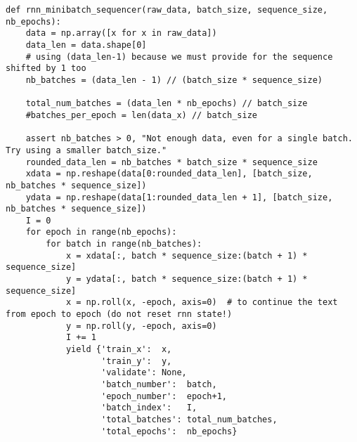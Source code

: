 \documentclass[10pt]{amsart}
\theoremstyle{definition}
\begin{document}
\begin{verbatim}
def rnn_minibatch_sequencer(raw_data, batch_size, sequence_size, nb_epochs):
    data = np.array([x for x in raw_data])
    data_len = data.shape[0]
    # using (data_len-1) because we must provide for the sequence shifted by 1 too
    nb_batches = (data_len - 1) // (batch_size * sequence_size)

    total_num_batches = (data_len * nb_epochs) // batch_size
    #batches_per_epoch = len(data_x) // batch_size

    assert nb_batches > 0, "Not enough data, even for a single batch. Try using a smaller batch_size."
    rounded_data_len = nb_batches * batch_size * sequence_size
    xdata = np.reshape(data[0:rounded_data_len], [batch_size, nb_batches * sequence_size])
    ydata = np.reshape(data[1:rounded_data_len + 1], [batch_size, nb_batches * sequence_size])
    I = 0
    for epoch in range(nb_epochs):
        for batch in range(nb_batches):
            x = xdata[:, batch * sequence_size:(batch + 1) * sequence_size]
            y = ydata[:, batch * sequence_size:(batch + 1) * sequence_size]
            x = np.roll(x, -epoch, axis=0)  # to continue the text from epoch to epoch (do not reset rnn state!)
            y = np.roll(y, -epoch, axis=0)
            I += 1
            yield {'train_x':  x,
                   'train_y':  y,
                   'validate': None,
                   'batch_number':  batch,
                   'epoch_number':  epoch+1,
                   'batch_index':   I,
                   'total_batches': total_num_batches,
                   'total_epochs':  nb_epochs}
\end{verbatim}
\end{document}

